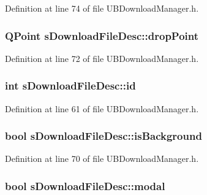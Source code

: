 Definition at line 74 of file U\-B\-Download\-Manager.\-h.

\hypertarget{structs_download_file_desc_a0344f0e1006956277665248807244798}{
\subsubsection[{drop\-Point}]{\setlength{\rightskip}{0pt plus 5cm}Q\-Point s\-Download\-File\-Desc\-::drop\-Point}}\label{d5/d15/structs_download_file_desc_a0344f0e1006956277665248807244798}


Definition at line 72 of file U\-B\-Download\-Manager.\-h.

\hypertarget{structs_download_file_desc_a09153ec49d55f18d9ad36aaa57b0e11f}{
\subsubsection[{id}]{\setlength{\rightskip}{0pt plus 5cm}int s\-Download\-File\-Desc\-::id}}\label{d5/d15/structs_download_file_desc_a09153ec49d55f18d9ad36aaa57b0e11f}


Definition at line 61 of file U\-B\-Download\-Manager.\-h.

\hypertarget{structs_download_file_desc_ad945d24ca6d26c992c66e95c0447f165}{
\subsubsection[{is\-Background}]{\setlength{\rightskip}{0pt plus 5cm}bool s\-Download\-File\-Desc\-::is\-Background}}\label{d5/d15/structs_download_file_desc_ad945d24ca6d26c992c66e95c0447f165}


Definition at line 70 of file U\-B\-Download\-Manager.\-h.

\hypertarget{structs_download_file_desc_abb72982d76747d63dca453ef483b3a3e}{
\subsubsection[{modal}]{\setlength{\rightskip}{0pt plus 5cm}bool s\-Download\-File\-Desc\-::modal}}\label{d5/d15/structs_download_file_desc_abb72982d76747d63dca453ef483b3a3e}


